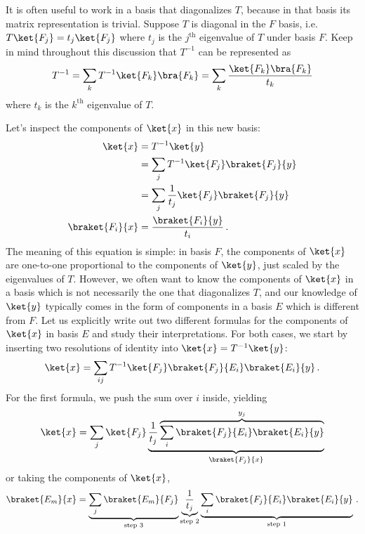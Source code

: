 
It is often useful to work in a basis that diagonalizes $T$, because in that basis its matrix representation is trivial.
Suppose $T$ is diagonal in the $F$ basis, i.e. $T\ket{F_j} = t_j \ket{F_j}$ where $t_j$ is the $j^\text{th}$ eigenvalue of $T$ under basis $F$.
Keep in mind throughout this discussion that $T^{-1}$ can be represented as
\begin{equation}
  T^{-1} = \sum_k T^{-1} \ket{F_k}\bra{F_k} = \sum_k \frac{\ket{F_k}\bra{F_k}}{t_k}
\end{equation}
where $t_k$ is the $k^\text{th}$ eigenvalue of $T$.

Let's inspect the components of $\ket{x}$ in this new basis:
\begin{align}
  \ket{x} &= T^{-1} \ket{y} \nonumber \\
  &= \sum_j T^{-1} \ket{F_j}\braket{F_j}{y} \nonumber \\
  &= \sum_j \frac{1}{t_j} \ket{F_j}\braket{F_j}{y} \nonumber \\
  \braket{F_i}{x} &= \frac{\braket{F_i}{y}}{t_i}
  \, .
\end{align}
The meaning of this equation is simple: in basis $F$, the components of $\ket{x}$ are one-to-one proportional to the components of $\ket{y}$, just scaled by the eigenvalues of $T$.
However, we often want to know the components of $\ket{x}$ in a basis which is not necessarily the one that diagonalizes $T$, and our knowledge of $\ket{y}$ typically comes in the form of components in a basis $E$ which is different from $F$.
Let us explicitly write out two different formulas for the components of $\ket{x}$ in basis $E$ and study their interpretations.
For both cases, we start by inserting two resolutions of identity into $\ket{x} = T^{-1} \ket{y}$:
\begin{equation}
  \ket{x} = \sum_{ij} T^{-1} \ket{F_j} \braket{F_j}{E_i}\braket{E_i}{y}
  \, .
  \label{eq:master}  %
\end{equation}
For the first formula, we push the sum over $i$ inside, yielding
\begin{equation}
  \ket{x} = \sum_j \ket{F_j} \underbrace{\frac{1}{t_j} \overbrace{\sum_i \braket{F_j}{E_i} \braket{E_i}{y}}^{y_j}}_{\braket{F_j}{x}}
\end{equation}
or taking the components of $\ket{x}$,
\begin{equation}
  \braket{E_m}{x}
  =
    \underbrace{\sum_j \braket{E_m}{F_j}}_\text{step 3}
    \underbrace{\frac{1}{t_j}}_\text{step 2}
    \underbrace{\sum_i \braket{F_j}{E_i} \braket{E_i}{y}}_\text{step 1}
  \, . \label{eq:three_step_process_a}  %
\end{equation}
